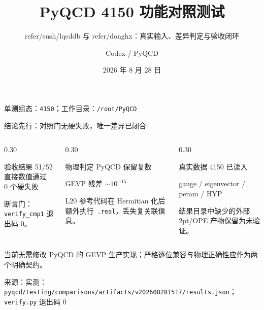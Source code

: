 \documentclass[UTF8,aspectratio=169,11pt]{ctexbeamer}
\title[PyQCD 4150 功能对照]{PyQCD 4150 功能对照测试}
\subtitle{\small refer/sush/lqcddb 与 refer/donghx：真实输入、差异判定与验收闭环}
\author[Codex]{Codex / PyQCD}
\institute{格点 QCD：梯度流重整化核子胶子 TMD-PDF}
\date{2026 年 8 月 28 日}
\newcommand{\source}[1]{\vspace{0.05em}\par{\raggedright\scriptsize\color{muted}来源：#1\par}}
\begin{document}
\begin{frame}[plain]
  \titlepage
  \vfill
  \begin{center}
    \small 单测组态：\texttt{4150}；工作目录：\texttt{/root/PyQCD}
  \end{center}
\end{frame}

\begin{frame}[t]{结论先行：对照门无硬失败，唯一差异已闭合}
  \begin{columns}[T,totalwidth=\textwidth]
    \begin{column}{0.30\textwidth}
      \begin{block}{验收结果}
        \centering
        {\Large\textcolor{evidence}{51/52}}\\[-0.1em]
        直接数值通过\\
        \textcolor{evidence}{0 个硬失败}
      \end{block}
      \small 断言门：\texttt{verify\_cmp1} 退出码 0。
    \end{column}
    \begin{column}{0.30\textwidth}
      \begin{block}{物理判定}
        \centering
        \textcolor{evidence}{PyQCD 保留复数}\par
        \textcolor{evidence}{GEVP 残差 $\sim10^{-15}$}
      \end{block}
      \small L20 参考代码在 Hermitian 化后额外执行 \,\texttt{.real}，丢失复关联信息。
    \end{column}
    \begin{column}{0.30\textwidth}
      \begin{block}{真实数据}
        \centering
        \textcolor{evidence}{4150 已读入}\par
        gauge / eigenvector / peram / HYP
      \end{block}
      \small 结果目录中缺少的外部 2pt/OPE 产物保留为未验证。
    \end{column}
  \end{columns}
  \vfill
  \begin{center}
    \colorbox{good}{\parbox{0.90\linewidth}{\centering
      当前无需修改 PyQCD 的 GEVP 生产实现；严格逐位兼容与物理正确性应作为两个明确契约。}}
  \end{center}
  \source{实测：\texttt{pyqcd/testing/comparisons/artifacts/v202608281517/results.json}；\texttt{verify.py} 退出码 0}
\end{frame}
\end{document}
